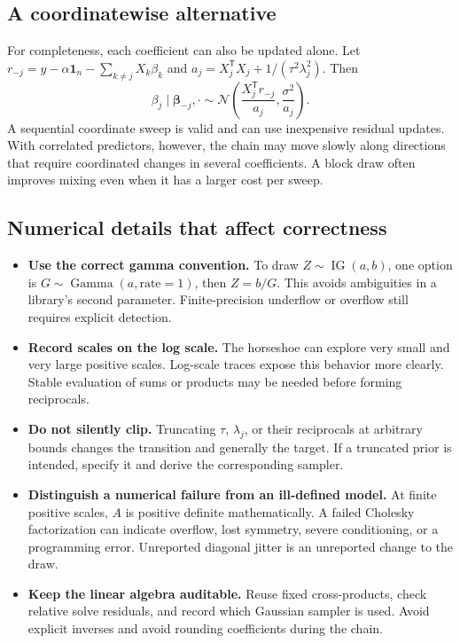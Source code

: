 \documentclass[11pt,letterpaper]{article}
\numberwithin{equation}{section}
\newcommand{\IG}{\operatorname{IG}}
\newcommand{\Ga}{\operatorname{Gamma}}
\newcommand{\Normal}{\mathcal{N}}
\newcommand{\given}{\mid}
\newcommand{\bbeta}{\bm{\beta}}
\newcommand{\ones}{\mathbf{1}}
\newcommand{\trans}{^{\mathsf T}}
\begin{document}
\subsection{A coordinatewise alternative}

For completeness, each coefficient can also be updated alone. Let
\(r_{-j}=y-\alpha\ones_n-\sum_{k\ne j}X_k\beta_k\) and
\(a_j=X_j\trans X_j+1/(\tau^2\lambda_j^2)\). Then
\begin{equation}
 \beta_j\given\bbeta_{-j},\cdot\sim
 \Normal\left(\frac{X_j\trans r_{-j}}{a_j},\frac{\sigma^2}{a_j}\right).
\end{equation}
A sequential coordinate sweep is valid and can use inexpensive residual
updates. With correlated predictors, however, the chain may move slowly
along directions that require coordinated changes in several coefficients.
A block draw often improves mixing even when it has a larger cost per sweep.

\subsection{Numerical details that affect correctness}

\begin{itemize}
\item \textbf{Use the correct gamma convention.} To draw \(Z\sim\IG(a,b)\),
one option is \(G\sim\Ga(a,\text{rate}=1)\), then \(Z=b/G\).
This avoids ambiguities in a library's second parameter. Finite-precision
underflow or overflow still requires explicit detection.
\item \textbf{Record scales on the log scale.} The horseshoe can explore very
small and very large positive scales. Log-scale traces expose this behavior
more clearly. Stable evaluation of sums or products may be needed before
forming reciprocals.
\item \textbf{Do not silently clip.} Truncating \(\tau\), \(\lambda_j\),
or their reciprocals at arbitrary bounds changes the transition and generally
the target. If a truncated prior is intended, specify it and derive the
corresponding sampler.
\item \textbf{Distinguish a numerical failure from an ill-defined model.}
At finite positive scales, \(A\) is positive definite mathematically. A
failed Cholesky factorization can indicate overflow, lost symmetry, severe
conditioning, or a programming error. Unreported diagonal jitter is an
unreported change to the draw.
\item \textbf{Keep the linear algebra auditable.} Reuse fixed cross-products,
check relative solve residuals, and record which Gaussian sampler is used.
Avoid explicit inverses and avoid rounding coefficients during the chain.
\end{itemize}
\end{document}
